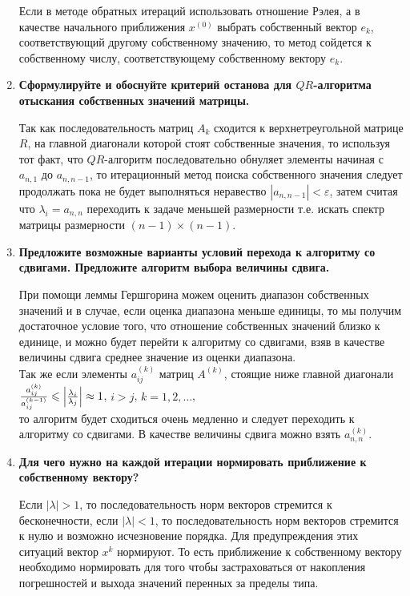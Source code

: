 \documentclass[12pt, a4paper]{article}
\begin{document}
\begin{enumerate}
	Если в методе обратных итераций использовать отношение Рэлея, а в качестве начального приближения $ x^{(0)} $ выбрать собственный вектор $ e_{k} $, соответствующий другому собственному значению, то метод сойдется к собственному числу, соответствующему собственному вектору $ e_{k} $.

    \item {\bf Сформулируйте и обоснуйте критерий останова для $QR$-алгоритма отыскания собственных значений матрицы. }
    
    Так как последовательность матриц $A_k$ сходится к верхнетреугольной матрице $R$, на главной диагонали которой стоят собственные значения, то используя тот факт, что $QR$-алгоритм последовательно обнуляет элементы начиная с $a_{n,1}$ до $a_{n,n-1}$, то итерационный метод поиска собственного значения следует продолжать пока не будет выполняться неравество $|a_{n,n-1}|<\varepsilon$, затем считая что $\lambda_i=a_{n,n}$ переходить к задаче меньшей размерности т.е. искать спектр матрицы размерности $(n-1)\times(n-1).$

    \item {\bf Предложите возможные варианты условий перехода к алгоритму со сдвигами. Предложите алгоритм выбора величины  сдвига. }
    
    При помощи леммы Гершгорина можем оценить диапазон собственных значений и в случае, если оценка диапазона меньше единицы, то мы получим достаточное условие того, что отношение собственных значений близко к единице, и можно будет перейти к алгоритму со сдвигами, взяв в качестве величины сдвига среднее значение из оценки диапазона.\\
Так же если элементы $a_{ij}^{(k)}$ матриц $A^{(k)}$, стоящие ниже главной диагонали $\frac{a_{ij}^{(k)}}{a_{ij}^{(k-1)}}\leqslant\Bigl|\frac{\lambda_i}{\lambda_j}\Bigr|\approx 1$, $i>j$, $k=1,2,\dots$,\\ то алгоритм будет сходиться очень медленно и следует переходить к алгоритму со сдвигами. В качестве величины сдвига можно взять $a_{n,n}^{(k)}$.

    \item {\bf Для чего нужно на каждой итерации нормировать приближение к собственному вектору? }
    
    Если $ | \lambda | > 1 $, то последовательность норм векторов стремится к бесконечности, если $ | \lambda | < 1 $, то последовательность норм векторов стремится к нулю и возможно исчезновение порядка. Для предупреждения этих ситуаций вектор $ x^{k} $ нормируют.
То есть приближение к собственному вектору необходимо нормировать для того чтобы застраховаться от накопления погрешностей и выхода значений перенных за пределы типа.


\end{enumerate}
\end{document}
